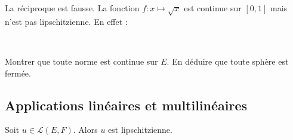 \documentclass[french,11pt,twoside]{VcCours}
\begin{document}
\begin{Remarque}{} La réciproque est fausse. La fonction $f : x \mapsto \sqrt{x}$ est continue sur $[0,1]$ mais n'est pas lipschitzienne. En effet :

\vspace*{6cm}~
\end{Remarque}

\begin{ApplicationDirecte}{} Montrer que toute norme est continue sur $E$. En déduire que toute sphère est fermée.
\end{ApplicationDirecte}

\subsection{Applications linéaires et multilinéaires}

\begin{Theoreme}{} Soit $u \in \mathcal{L}(E,F)$. Alors $u$ est lipschitzienne.
\end{Theoreme}

\begin{Demonstration}{} 
\newpage

\vspace*{8cm}
\end{Demonstration}
\end{document}
